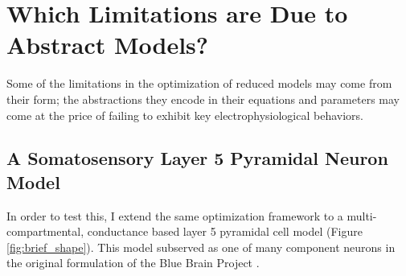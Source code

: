 
\section{Which Limitations are Due to Abstract Models?}
\label{sec:optimization-performance}

Some of the limitations in the optimization of reduced models may come from their form; the abstractions they encode in their equations and parameters may come at the price of failing to exhibit key electrophysiological behaviors.

\subsection{A Somatosensory Layer 5 Pyramidal Neuron Model}
In order to test this, I extend the same optimization framework to a multi-compartmental, conductance based layer 5 pyramidal cell model \citep{van2016bluepyopt} (Figure \ref{fig:brief_shape}).
This model subserved as one of many component neurons in the original formulation of the Blue Brain Project \cite{markram2015reconstruction}.

